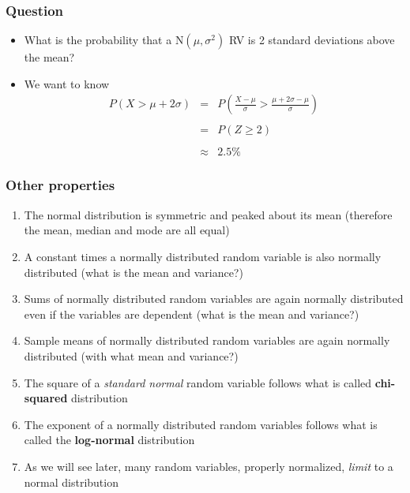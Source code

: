 \documentclass[aspectratio=169]{beamer}
\begin{document}
\begin{frame}\frametitle{Question}
\begin{itemize}
\item What is the probability that a $\mbox{N}(\mu,\sigma^2)$ RV is 2 standard deviations
  above the mean?
\item We want to know
  \begin{eqnarray*}
  P(X > \mu + 2\sigma) & = & 
P\left(\frac{X -\mu}{\sigma} > \frac{\mu + 2\sigma - \mu}{\sigma}\right)    \\ \\
& = & P(Z \geq 2 ) \\ \\ 
& \approx & 2.5\%
  \end{eqnarray*}
\end{itemize}
\end{frame}


\begin{frame}\frametitle{Other properties}
\begin{enumerate}
\item The normal distribution is symmetric and peaked about its mean (therefore
  the mean, median and mode are all equal)
\item A constant times a normally distributed random variable is also
  normally distributed (what is the mean and variance?)
\item Sums of normally distributed random variables are again normally distributed
  even if the variables are dependent (what is the mean and variance?)
\item Sample means of normally distributed random variables are again normally distributed
  (with what mean and variance?)
\item The square of a {\em standard normal} random variable follows what is 
  called {\bf chi-squared} distribution 
\item The exponent of a normally distributed random variables follows what is 
  called the {\bf log-normal} distribution 
\item As we will see later, many random variables, properly
  normalized, {\em limit} to a normal distribution 
\end{enumerate}
\end{frame}
\end{document}
